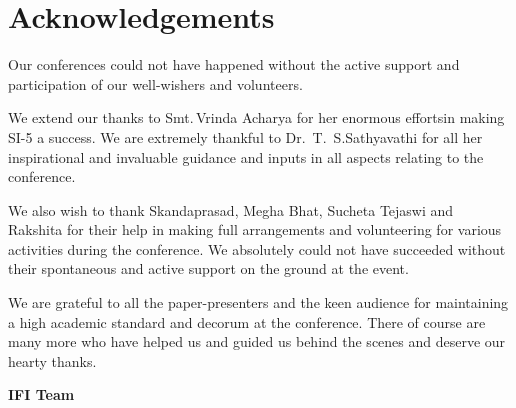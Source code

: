 
\chapter*{Acknowledgements}\label{ack}

Our conferences could not have happened without the active support and participation of our well-wishers and volunteers.

We extend our thanks to Smt.\,Vrinda Acharya for her enormous efforts\break in making SI-5 a success. We are extremely thankful to Dr.~T.~S.\break Sathyavathi for all her inspirational and invaluable guidance and inputs in all aspects relating to the conference.

We also wish to thank Skandaprasad, Megha Bhat, Sucheta Tejaswi and Rakshita for their help in making full arrangements and volunteering for various activities during the conference. We absolutely could not have succeeded without their spontaneous and active support on the ground at the event.

We are grateful to all the paper-presenters and the keen audience for maintaining a high academic standard and decorum at the conference. There of course are many more who have helped us and guided us behind the scenes and deserve our hearty thanks.

\begin{flushright}
\textbf{IFI Team}
\end{flushright}

